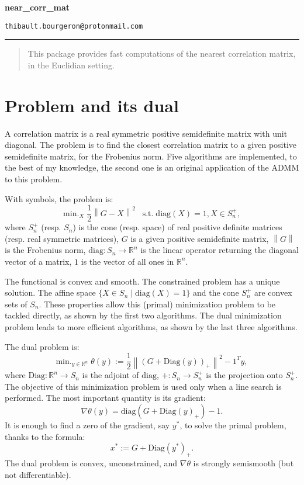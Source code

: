 \documentclass{article}
\newcommand{\norm}[1]{\left\lVert#1\right\rVert}
\newcommand{\R}{\mathbb{R}}
\begin{document}
\begin{center}
{\LARGE \textbf{near\_corr\_mat}}
\end{center}

\setlength\parindent{0pt}

\begin{center}
\texttt{thibault.bourgeron@protonmail.com}
\end{center}

\noindent\rule{\textwidth}{0.1pt}


\begin{abstract}
This package provides fast computations of the nearest correlation matrix, in the Euclidian setting.
\end{abstract}

\section{Problem and its dual}

A correlation matrix is a real symmetric positive semidefinite matrix with unit diagonal.
The problem is to find the closest correlation matrix to a given positive semidefinite matrix, for the Frobenius norm. Five algorithms are implemented, to the best of my knowledge, the second one is an original application of the ADMM to this problem.

\medskip

With symbols, the problem is:
\[ \textrm{min.}_X \; \frac12 \norm{G - X}^2 \;\;\; \text{s.t.} \; \mathrm{diag}(X) = 1, X \in S_n^+, \]
where $S_n^+$ (resp. $S_n$) is the cone (resp. space) of real positive definite matrices (resp. real symmetric matrices), $G$ is a given positive semidefinite matrix, $\norm{G}$ is the Frobenius norm, $\mathrm{diag}: S_n \to \R^n$ is the linear operator returning the diagonal vector of a matrix, $1$ is the vector of all ones in $\R^n$.

\medskip

The functional is convex and smooth. The constrained problem has a unique solution. The affine space $\{X\in S_n \mid \mathrm{diag}(X) = 1\}$ and the cone $S_n^+$ are convex sets of $S_n$. These properties allow this (primal) minimization problem to be tackled directly, as shown by the first two algorithms. The dual minimization problem leads to more efficient algorithms, as shown by the last three algorithms.

\bigskip

The dual problem is:
\[\textrm{min.}_{y\in\R^n} \; \theta(y) := \frac12 \norm{(G + \mathrm{Diag}(y))_+}^2 - 1^T y, \]
where $\mathrm{Diag}: \R^n \to S_n$ is the adjoint of $\mathrm{diag}$, $+: S_n \to S_n^+$ is the projection onto $S_n^+$.
The objective of this minimization problem is used only when a line search is performed.
The most important quantity is its gradient:
\[
\nabla \theta(y) = \mathrm{diag}(G + \mathrm{Diag}(y)_+) - 1.
\]
It is enough to find a zero of the gradient, say $y^*$, to solve the primal problem, thanks to the formula:
\[ x^* := G + \mathrm{Diag}(y^*)_+. \]
The dual problem is convex, unconstrained, and $\nabla \theta$ is strongly semismooth (but not differentiable).
\end{document}
